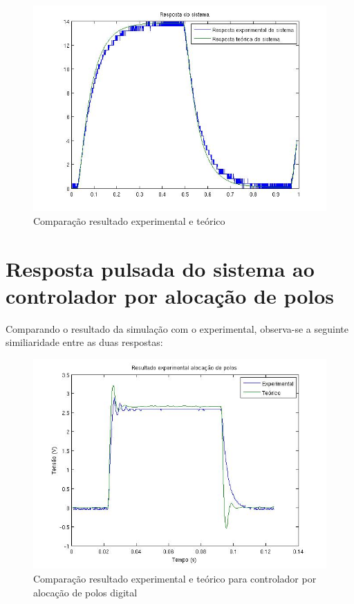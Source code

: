 \documentclass[
oneside,					%
a4paper,					%
english,					%
brazil,					%
]{abntex2}
\begin{document}
 \begin{figure}[H]
 	\centering
 	\includegraphics[scale = 0.7]{Respostas.jpg}
 	\caption{Comparação resultado experimental e teórico}
 \end{figure}

\section{Resposta pulsada do sistema ao controlador por alocação de polos}

Comparando o resultado da simulação com o experimental, observa-se a seguinte similiaridade entre as duas respostas:

\begin{figure}[H]
	\centering
	\includegraphics[scale = 0.7]{Resposta_Proporcional.jpg}
	\caption{Comparação resultado experimental e teórico para controlador por alocação de polos digital}
\end{figure}
\end{document}
